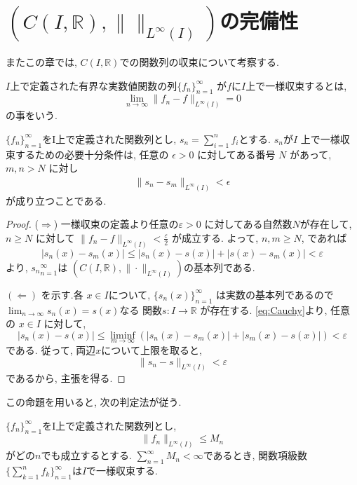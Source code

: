 \documentclass[12pt,xelatex,ja=standard]{bxjsarticle}
\begin{document}
\section{$(C(I,\mathbb{R}),\| \|_{L^\infty(I)})$の完備性}
\label{sec:関数列}
またこの章では,
$C(I,\mathbb{R})$での関数列の収束について考察する.

\begin{Definition}[一様収束の定義]
$I$上で定義された有界な実数値関数の列$\{{f_{n}\}}_{n=1}^{\infty}$
が$f$に$I$上で一様収束するとは,
	\[
	\lim_{n \to \infty} \|f_n - f \|_{L^\infty(I)} = 0
	\]
の事をいう.
\end{Definition}

\begin{Lemma}[Cauchyの判定法]
\label{Lemma:Cauchy}
$\{f_{n}\}_{n=1}^{\infty}$をI上で定義された関数列とし,
$s_{n}=\displaystyle \sum_{i=1}^{n} f_i$とする.
$s_{n}$が$I$ 上で一様収束するための必要十分条件は,
任意の $\epsilon > 0$ に対してある番号 $N$ があって,
$m, n > N$ に対し
	\begin{align}
	\| s_n - s_m \|_{L^\infty(I)} < \epsilon
	\label{eq:Cauchy}
	\end{align}
が成り立つことである.
\end{Lemma}
\begin{proof}
($\Rightarrow$)
一様収束の定義より任意の$ε > 0$ に対してある自然数$N$が存在して,
$n ≥ N$ に対して
$\|f_n - f\|_{L^\infty(I)} < \frac{\varepsilon}{2}$
が成立する.
よって, $n, m \geq N$, であれば
	\[
	|s_{n}(x) - s_{m}(x)|
	\leq |s_{n}(x) - s(x)| + |s(x) - s_{m}(x)| < ε
	\]
より, ${s_n}_{n = 1}^\infty$は
$(C(I,\mathbb{R}),\|\cdot\|_{L^\infty(I)})$の基本列である.

$(\Leftarrow)$ を示す.各 $x \in I$について,
$\{s_{n}(x)\}_{n=1}^{\infty}$
は実数の基本列であるので$\lim_{n \to \infty} s_{n}(x) = s(x)$なる
関数$s: I \to \mathbb R$ が存在する.
\eqref{eq:Cauchy}より, 任意の $x \in I$ に対して,
	\[
	|s_n(x) - s(x)|
	\leq \liminf_{m \to \infty}
	(|s_n(x) - s_m(x)| + |s_m(x) - s(x)|) < ε
	\]
である.
従って, 両辺$x$について上限を取ると,
	\[
	\|s_n - s\|_{L^\infty(I)} < ε
	\]
であるから, 主張を得る.
\end{proof}

この命題を用いると, 次の判定法が従う.

\begin{Theorem}
$\{f_{n}\}_{n=1}^{\infty}$をI上で定義された関数列とし,
	\[
	\|f_{n}\|_{L^\infty(I)} \leq M_{n}
	\]
がどの$n$でも成立するとする.
$\sum_{n=1}^{\infty} M_{n} < \infty $であるとき,
関数項級数$\{ \sum_{k=1}^{n} f_{k} \}^{\infty}_{n=1}$は$I$で一様収束する.
\end{Theorem}
\end{document}
